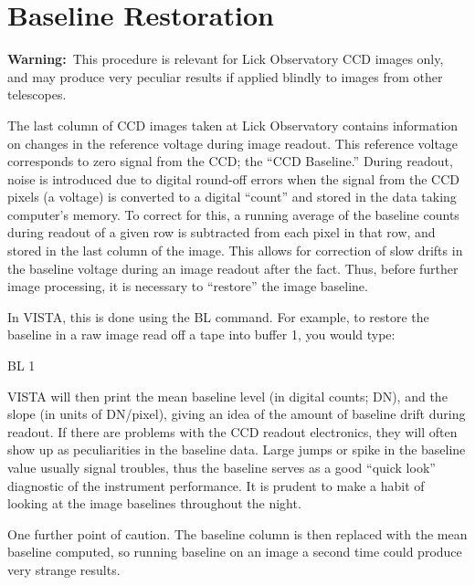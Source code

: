 \section{Baseline Restoration}

{\bf Warning:}\ This procedure is relevant for Lick Observatory CCD images
only, and may produce very peculiar results if applied blindly to images from
other telescopes. 

The last column of CCD images taken at Lick Observatory contains information
on changes in the reference voltage during image readout.  This reference
voltage corresponds to zero signal from the CCD; the ``CCD Baseline.''  During
readout, noise is introduced due to digital round-off errors when the signal
from the CCD pixels (a voltage) is converted to a digital ``count'' and stored
in the data taking computer's memory.  To correct for this, a running average
of the baseline counts during readout of a given row is subtracted from each
pixel in that row, and stored in the last column of the image.  This allows
for correction of slow drifts in the baseline voltage during an image readout
after the fact.  Thus, before further image processing, it is necessary to
``restore'' the image baseline. 

In VISTA, this is done using the BL command. For example, to restore the
baseline in a raw image read off a tape into buffer 1, you would type: 

\begin{command}
      \item BL 1
\end{command}

VISTA will then print the mean baseline level (in digital counts; DN), and the
slope (in units of DN/pixel), giving an idea of the amount of baseline drift
during readout.  If there are problems with the CCD readout electronics, they
will often show up as peculiarities in the baseline data.  Large jumps or
spike in the baseline value usually signal troubles, thus the baseline serves
as a good ``quick look'' diagnostic of the instrument performance.  It is
prudent to make a habit of looking at the image baselines throughout the night.

One further point of caution.  The baseline column is then replaced with the
mean baseline computed, so running baseline on an image a second time could
produce very strange results. 

%
